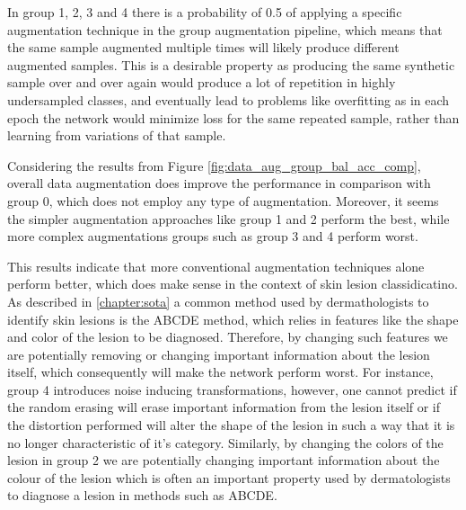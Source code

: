     In group 1, 2, 3 and 4 there is a probability of 0.5 of applying a specific augmentation technique in the group augmentation pipeline, which means that the same sample augmented multiple times will likely produce different augmented samples. This is a desirable property as producing the same synthetic sample over and over again would produce a lot of repetition in highly undersampled classes, and eventually lead to problems like overfitting as in each epoch the network would minimize loss for the same repeated sample, rather than learning from variations of that sample. \par
    
    Considering the results from Figure \ref{fig:data_aug_group_bal_acc_comp}, overall data augmentation does improve the performance in comparison with group 0, which does not employ any type of augmentation. Moreover, it seems the simpler augmentation approaches like group 1 and 2 perform the best, while more complex augmentations groups such as group 3 and 4 perform worst.   \par
    
    This results indicate that more conventional augmentation techniques alone perform better, which does make sense in the context of skin lesion classidicatino. As described in \autoref{chapter:sota} a common method used by dermathologists to identify skin lesions is the ABCDE method, which relies in features like the shape and color of the lesion to be diagnosed. Therefore, by changing such features we are potentially removing or changing important information about the lesion itself, which consequently will make the network perform worst. For instance, group 4 introduces noise inducing transformations, however, one cannot predict if the random erasing will erase important information from the lesion itself or if the distortion performed will alter the shape of the lesion in such a way that it is no longer characteristic of it's category. Similarly, by changing the colors of the lesion in group 2 we are potentially changing important information about the colour of the lesion which is often an important property used by dermatologists to diagnose a lesion in methods such as ABCDE.  \par
    

